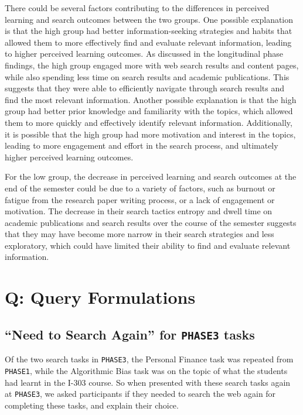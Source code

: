 \documentclass[letterpaper, nobind]{templates/ociamthesis}
\begin{document}
There could be several factors contributing to the differences in perceived learning and search outcomes between the two groups.
One possible explanation is that the high group had better information-seeking strategies and habits that allowed them to more effectively find and evaluate relevant information, leading to higher perceived learning outcomes. As discussed in the longitudinal phase findings, the high group engaged more with web search results and content pages, while also spending less time on search results and academic publications. This suggests that they were able to efficiently navigate through search results and find the most relevant information.
Another possible explanation is that the high group had better prior knowledge and familiarity with the topics, which allowed them to more quickly and effectively identify relevant information.
Additionally, it is possible that the high group had more motivation and interest in the topics, leading to more engagement and effort in the search process, and ultimately higher perceived learning outcomes.

For the low group, the decrease in perceived learning and search outcomes at the end of the semester could be due to a variety of factors, such as burnout or fatigue from the research paper writing process, or a lack of engagement or motivation. The decrease in their search tactics entropy and dwell time on academic publications and search results over the course of the semester suggests that they may have become more narrow in their search strategies and less exploratory, which could have limited their ability to find and evaluate relevant information.

\hypertarget{q-query-formulations-1}{%
\section{Q: Query Formulations}\label{q-query-formulations-1}}

\hypertarget{sec-res13-need-to-search}{%
\subsection{\texorpdfstring{``Need to Search Again'' for \texttt{PHASE3} tasks}{``Need to Search Again'' for PHASE3 tasks}}\label{sec-res13-need-to-search}}

Of the two search tasks in \texttt{PHASE3}, the Personal Finance task was repeated from \texttt{PHASE1}, while the Algorithmic Bias task was on the topic of what the students had learnt in the I-303 course.
So when presented with these search tasks again at \texttt{PHASE3}, we asked participants if they needed to search the web again for completing these tasks, and explain their choice.
\end{document}
